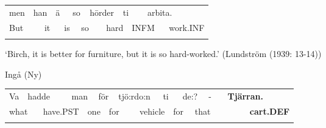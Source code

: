 \begin{tabular}{llllllllllllll}
\lsptoprule
men & \multicolumn{2}{l}{han

} & \multicolumn{2}{l}{ä

} & \multicolumn{2}{l}{so

} & \multicolumn{2}{l}{h\=order

} & \multicolumn{2}{l}{ti

} & \multicolumn{2}{l}{arbita.

} & \\
\multicolumn{2}{l}{But

} & \multicolumn{2}{l}{it

} & \multicolumn{2}{l}{is

} & \multicolumn{2}{l}{so

} & \multicolumn{2}{l}{hard

} & \multicolumn{2}{l}{INFM 

} & \multicolumn{2}{l}{work.INF

}\\
\lspbottomrule
\end{tabular}

\begin{styleTranslation}
‘Birch, it is better for furniture, but it is so hard-worked.’ (Lundström (1939: 13-14))

\end{styleTranslation}

\begin{listWWNumileveli}
\item {}

\begin{styleExample}
Ingå (Ny)

\end{styleExample}

\end{listWWNumileveli}

\begin{tabular}{llllllllllllllllll}
\lsptoprule
Va & \multicolumn{2}{l}{hadde

} & \multicolumn{2}{l}{man

} & \multicolumn{2}{l}{för

} & \multicolumn{2}{l}{tjö:rdo:n

} & \multicolumn{2}{l}{ti

} & \multicolumn{2}{l}{de:?

} & \multicolumn{2}{l}{{}-

} & \multicolumn{2}{l}{{\bfseries Tjärran.}

} & \\
\multicolumn{2}{l}{what

} & \multicolumn{2}{l}{have.PST

} & \multicolumn{2}{l}{one

} & \multicolumn{2}{l}{for

} & \multicolumn{2}{l}{vehicle

} & \multicolumn{2}{l}{for

} & \multicolumn{2}{l}{that

} & \multicolumn{2}{l}{} & \multicolumn{2}{l}{{\bfseries cart.DEF}

}\\
\lspbottomrule
\end{tabular}

